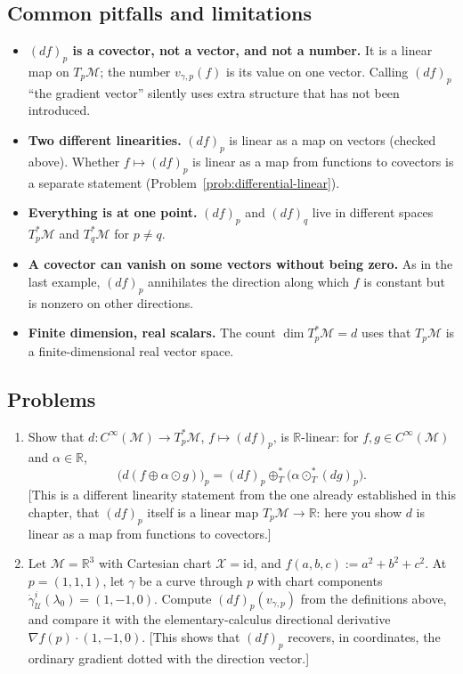 \documentclass[11pt]{article}
\newcommand{\TpM}{T_p\mathcal M}
\newcommand{\TpsM}{T_p^*\mathcal M}
\newcommand{\Cinf}{C^\infty(\mathcal M)}
\begin{document}
\subsection*{Common pitfalls and limitations}

\begin{itemize}
  \item \textbf{$(df)_p$ is a covector, not a vector, and not a number.} It is a linear map on $\TpM$; the number $v_{\gamma,p}(f)$ is its value on one vector. Calling $(df)_p$ ``the gradient vector'' silently uses extra structure that has not been introduced.
  \item \textbf{Two different linearities.} $(df)_p$ is linear as a map on vectors (checked above). Whether $f\mapsto(df)_p$ is linear as a map from functions to covectors is a separate statement (Problem~\ref{prob:differential-linear}).
  \item \textbf{Everything is at one point.} $(df)_p$ and $(df)_q$ live in different spaces $\TpsM$ and $T_q^*\mathcal M$ for $p\neq q$.
  \item \textbf{A covector can vanish on some vectors without being zero.} As in the last example, $(df)_p$ annihilates the direction along which $f$ is constant but is nonzero on other directions.
  \item \textbf{Finite dimension, real scalars.} The count $\dim\TpsM=d$ uses that $\TpM$ is a finite-dimensional real vector space.
\end{itemize}

\subsection*{Problems}

\begin{enumerate}[label=\textbf{4.\arabic*}, leftmargin=2.2cm, start=12]

\item \label{prob:differential-linear}
Show that $d:\Cinf\to T_p^*\mathcal M$, $f\mapsto(df)_p$, is $\mathbb
R$-linear: for $f,g\in\Cinf$ and $\alpha\in\mathbb R$,
\[
\big(d(f\oplus\alpha\odot g)\big)_p = (df)_p \oplus_T^* \big(\alpha\odot_T^* (dg)_p\big).
\]
[This is a different linearity statement from the one already established
in this chapter, that $(df)_p$ itself is a linear map $T_p\mathcal
M\to\mathbb R$: here you show $d$ is linear as a map from functions to
covectors.]

\item \label{prob:gradient-directional-derivative}
Let $\mathcal M=\mathbb R^3$ with Cartesian chart $\mathcal X=\mathrm{id}$,
and $f(a,b,c):=a^2+b^2+c^2$. At $p=(1,1,1)$, let $\gamma$ be a curve through
$p$ with chart components $\dot\gamma^i_{\mathcal U}(\lambda_0)=(1,-1,0)$.
Compute $(df)_p(v_{\gamma,p})$ from the definitions above, and compare it
with the elementary-calculus directional derivative $\nabla f(p)\cdot
(1,-1,0)$. [This shows that $(df)_p$ recovers, in coordinates, the ordinary
gradient dotted with the direction vector.]

\end{enumerate}
\end{document}
